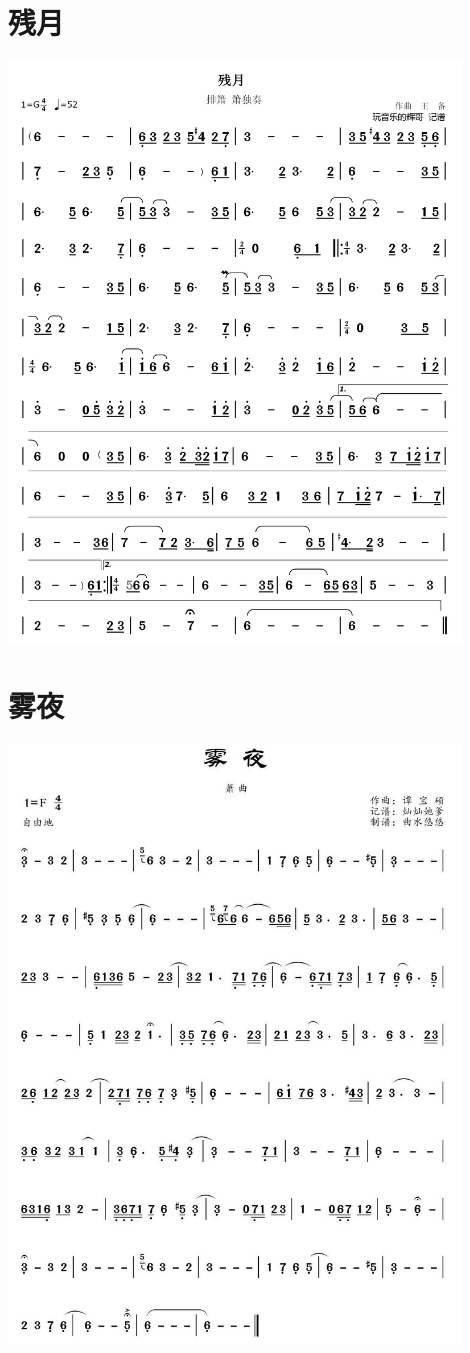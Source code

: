 \documentclass[cn,pad,twocol]{elegantbook}
\begin{document}
\section{残月}  \includegraphics[width=0.9\textwidth]{rpi400/20210127残月.jpg}
\section{雾夜}  \includegraphics[width=0.9\textwidth]{rpi400/20210127雾夜.jpg}
\end{document}
